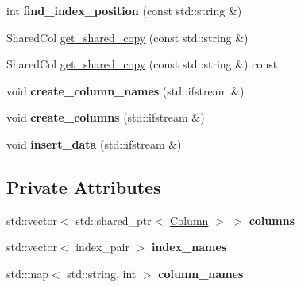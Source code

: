 \begin{DoxyCompactItemize}
int {\bfseries find\+\_\+index\+\_\+position} (const std\+::string \&)
\item 
Shared\+Col \hyperlink{classDataFrame_a6386fb76796f1f414311486aa5f253be}{get\+\_\+shared\+\_\+copy} (const std\+::string \&)
\item 
Shared\+Col \hyperlink{classDataFrame_a97842254d757876650ea5bada057855e}{get\+\_\+shared\+\_\+copy} (const std\+::string \&) const
\item 
\mbox{\label{classDataFrame_a58b6f17ec1c51b993b16ae5287ba5c94}} 
void {\bfseries create\+\_\+column\+\_\+names} (std\+::ifstream \&)
\item 
\mbox{\label{classDataFrame_adcc4a605d4be1f108846e002adb7c1b3}} 
void {\bfseries create\+\_\+columns} (std\+::ifstream \&)
\item 
\mbox{\label{classDataFrame_acbc3c2d44c5d5a8783208d5e01417d39}} 
void {\bfseries insert\+\_\+data} (std\+::ifstream \&)
\end{DoxyCompactItemize}
\subsection*{Private Attributes}
\begin{DoxyCompactItemize}
\item 
\mbox{\label{classDataFrame_a9c466c6766286ba229148f45e3a8eb87}} 
std\+::vector$<$ std\+::shared\+\_\+ptr$<$ \hyperlink{classColumn}{Column} $>$ $>$ {\bfseries columns}
\item 
\mbox{\label{classDataFrame_a5f4aba20b8b39450f6543ba2919a2693}} 
std\+::vector$<$ index\+\_\+pair $>$ {\bfseries index\+\_\+names}
\item 
\mbox{\label{classDataFrame_ae655c8a49567c2acd61bd2f05276779a}} 
std\+::map$<$ std\+::string, int $>$ {\bfseries column\+\_\+names}
\end{DoxyCompactItemize}
